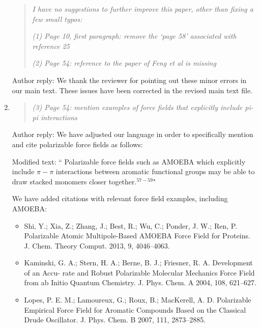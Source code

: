 \documentclass{article}
\begin{document}
\begin{enumerate}
\begin{quote}
	\textit{I have no suggestions to further improve this paper, other than fixing a few small typos:}
	
    \textit{(1) Page 10, first paragraph: remove the ‘page 58’ associated with reference 25}

    \textit{(2) Page 54: reference to the paper of Feng et al is missing}

	\end{quote}
    
    Author reply: We thank the reviewer for pointing out these minor errors in our main text. These issues have been corrected in
    the revised main text file. %
    
    \item \begin{quote} \textit{(3) Page 54: mention examples of force fields that explicitly include pi-pi interactions
    } \end{quote}
    
    Author reply: We have adjusted our language in order to specifically mention and cite polarizable force fields as follows: 
    
    Modified text: ``{\color{red} Polarizable} force fields {\color{red} such as AMOEBA which}
    explicitly include $\pi-\pi$ interactions {\color{red} between aromatic functional groups}
    may be able to draw stacked monomers closer together.{\color{red}$^{57-59}$}"
     
    We have added citations with relevant force field examples, including AMOEBA:
     
    \begin{itemize}
     
    \item Shi, Y.; Xia, Z.; Zhang, J.; Best, R.; Wu, C.; Ponder, J. W.; Ren, P. Polarizable Atomic
    Multipole-Based AMOEBA Force Field for Proteins. J. Chem. Theory Comput. 2013,
    9, 4046–4063.
    
    \item Kaminski, G. A.; Stern, H. A.; Berne, B. J.; Friesner, R. A. Development of an Accu-
    rate and Robust Polarizable Molecular Mechanics Force Field from ab Initio Quantum
    Chemistry. J. Phys. Chem. A 2004, 108, 621–627.
    
    \item Lopes, P. E. M.; Lamoureux, G.; Roux, B.; MacKerell, A. D. Polarizable Empirical
    Force Field for Aromatic Compounds Based on the Classical Drude Oscillator. J. Phys.
    Chem. B 2007, 111, 2873–2885.
    
    \end{itemize}

\end{enumerate}
\end{document}
